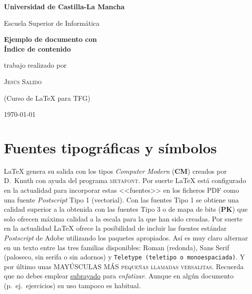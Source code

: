 \documentclass[ 		%
	11pt,				%
	a4paper,			%
	twoside,			%
	openright,			%
	final       		%
]{book}
\begin{document}
\frontmatter

\begin{titlepage}
    \begin{center}
    	\LARGE
    	{\bfseries Universidad de Castilla-La Mancha\par}
    	Escuela Superior de Informática\par
    	\vspace{4cm}
    	{\huge\bfseries Ejemplo de documento con \\
                        Índice de contenido\par}
    	{\small \phantom{(Portada 5)}}
    	\vspace{3cm}
    	\par
    \end{center}
	\hfill\begin{minipage}{.5\linewidth}
		\normalsize
		trabajo realizado por\par
		\textsc{Jesús Salido}\par
        (Curso de \LaTeX{} para TFG)
	\end{minipage}
	\vfill
	\centering	\today
\end{titlepage}

\cleardoublepage
\setcounter{tocdepth}{1} %
\tableofcontents
\listoffigures
\listoftables


\mainmatter

\chapter{Fuentes tipográficas y símbolos}
\LaTeX{} genera su salida con los tipos \emph{Computer Modern} (\textbf{CM}) creados por D.~Knuth con ayuda del programa \textsc{metafont}. Por suerte \LaTeX{} está configurado en la actualidad para incorporar estas <<fuentes>> en los ficheros PDF como una fuente \emph{Postscript} Tipo 1 (vectorial). Con las fuentes Tipo 1 se obtiene una calidad superior a la obtenida con las fuentes Tipo 3 o de mapa de bits (\textbf{PK}) que solo ofrecen máxima calidad a la escala para la que han sido creadas. Por suerte en la actualidad \LaTeX{} ofrece la posibilidad de incluir las fuentes estándar \emph{Postscript} de \textsf{Adobe} utilizando los paquetes apropiados. Así es muy claro alternar en un texto entre las tres familias disponibles: Roman (redonda), \textsf{Sans Serif (paloseco, sin serifa o sin adornos)} y \texttt{Teletype (teletipo o monoespaciada)}. Y por último unas MAYÚSCULAS MÁS \textsc{pequeñas llamadas versalitas}. Recuerda que no debes emplear \underline{subrayado} para \emph{enfatizar}. Aunque en algún documento (p.~ej.\ ejercicios) su uso tampoco es habitual.
\end{document}
